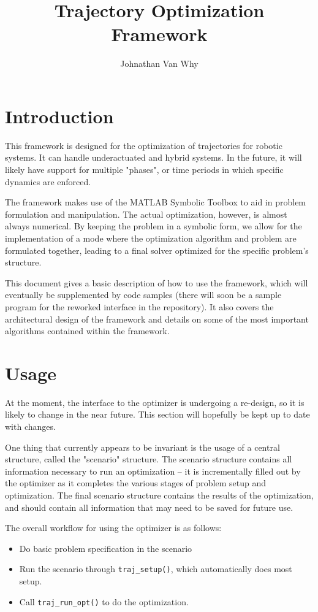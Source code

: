 \documentclass{article} %
\title{Trajectory Optimization Framework}
\author{Johnathan Van Why}
\begin{document}
	\maketitle
	\section{Introduction}
		This framework is designed for the optimization of trajectories for robotic systems.
		It can handle underactuated and hybrid systems. In the future, it will likely have support for multiple
		"phases", or time periods in which specific dynamics are enforced.

		The framework makes use of the MATLAB Symbolic Toolbox to aid in problem formulation and manipulation.
		The actual optimization, however, is almost always numerical. By keeping the problem in a symbolic form, we
		allow for the implementation of a mode where the optimization algorithm and problem are formulated together, leading
		to a final solver optimized for the specific problem's structure.

		This document gives a basic description of how to use the framework, which
		will eventually be supplemented by code samples (there will soon be a sample program
		for the reworked interface in the repository). It also covers the architectural design of the framework
		and details on some of the most important algorithms contained within the framework.

	\section{Usage}
		At the moment, the interface to the optimizer is undergoing a re-design, so it is likely to change in the near future.
		This section will hopefully be kept up to date with changes.

		One thing that currently appears to be invariant is the usage of a central structure, called the "scenario" structure.
		The scenario structure contains all information necessary to run an optimization -- it is incrementally filled out by the optimizer
		as it completes the various stages of problem setup and optimization. The final scenario structure contains the results of the optimization,
		and should contain all information that may need to be saved for future use.

		\begin{samepage}
			The overall workflow for using the optimizer is as follows:
			\begin{itemize}
				\item Do basic problem specification in the scenario
				\item Run the scenario through \lstinline|traj_setup()|, which automatically does most setup.
				\item Call \lstinline|traj_run_opt()| to do the optimization.
			\end{itemize}
		\end{samepage}
\end{document}
